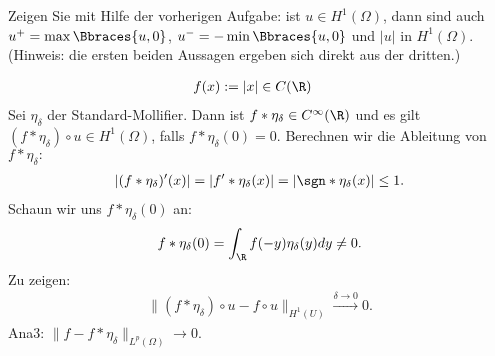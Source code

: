 
\begin{exercise}

Zeigen Sie mit Hilfe der vorherigen Aufgabe:
ist $u \in H^1(\Omega)$, dann sind auch $u^+ = \max \Bbraces{u, 0}$, $u^- = - \min \Bbraces{u, 0}$ und $|u|$ in $H^1(\Omega)$.
(Hinweis: die ersten beiden Aussagen ergeben sich direkt aus der dritten.)

\end{exercise}


\begin{solution}

\begin{align*}
  f(x) &:= |x| \in C(\R)
\end{align*}
Sei $\eta_\delta$ der Standard-Mollifier. Dann ist $f\ast \eta_\delta \in C^{\infty}(\R)$
und es gilt $(f\ast\eta_\delta) \circ u \in H^1(\Omega)$, falls $f\ast\eta_\delta(0) = 0$.
Berechnen wir die Ableitung von $f\ast\eta_\delta:$
\begin{align*}
  |(f\ast\eta_\delta)^{\prime}(x)| = |f^{\prime}\ast\eta_\delta(x)| = |\sgn\ast\eta_\delta(x)| \leq 1.
\end{align*}
Schaun wir uns $f\ast\eta_\delta(0)$ an:
\begin{align*}
  f\ast\eta_\delta(0) = \int_{\R}f(-y)\eta_\delta(y) dy \neq 0.
\end{align*}
Zu zeigen:
\begin{align*}
  \|(f\ast\eta_\delta) \circ u - f\circ u\|_{H^1(U)} \xrightarrow{\delta \to 0} 0.
\end{align*}
Ana3: $\|f- f\ast\eta_\delta\|_{L^p(\Omega)} \to 0$.
\end{solution}

